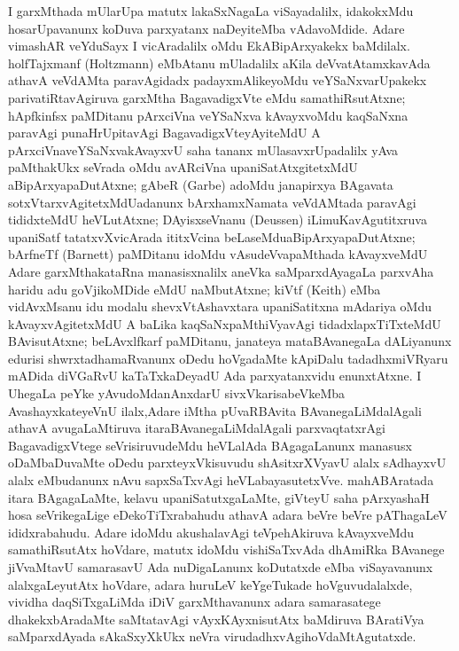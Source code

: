 I garxMthada mUlarUpa matutx lakaSxNagaLa viSayadalilx, idakokxMdu hosa\-rUpa\-vanunx koDuva parxyatanx naDeyiteMba vAdavoMdide. Adare vimashAR veYduSayx I vicAradalilx oMdu EkABipArxyakekx baMdilalx. holfTajxmanf {\rm(Holtzmann)} eMbA\-tanu mUladalilx aKila deVvatAtamxkavAda athavA veVdAMta paravAgidadx padayx\-mAlike\break\-yoMdu veYSaNxvarUpakekx parivatiRtavAgiruva garxMtha BagavadigxVte eMdu samathiRsu\-tAtxne; hApfkinfsx paMDitanu pArxciVna veYSaNxva kAvayxvoMdu kaqSaNxna paravAgi punaHrUpita\-vAgi BagavadigxVteyAyiteMdU A pArxciVnaveYSaNxvakAvayxvU saha tananx mUlasavxrUpa\-dalilx yAva paMthakUkx seVrada oMdu avARciVna upaniSatAtxgitetxMdU aBipArxya\-paDutAtxne; gAbeR {\rm(Garbe)} adoMdu janapirxya BAgavata sotxVtarxvAgitetxMdU\break \hbox{adanunx} bArxhamxNamata veVdAMtada paravAgi tididxteMdU heVLutAtxne; DAyisxseVnanu {\rm(Deussen)} iLimuKavAgutitxruva upaniSatf tatatxvXvicArada ititxVcina beLaseMdu\break aBipArxyapaDutAtxne; bArfneTf {\rm(Barnett)} paMDitanu idoMdu vAsudeVva\break paMthada kAvayxveMdU Adare garxMthakataRna manasisxnalilx aneVka saMparxdAyagaLa parxvAha haridu adu goVjikoMDide eMdU naMbutAtxne; kiVtf {\rm(Keith)} eMba vidAvxMsanu idu modalu shevxVtAshavxtara upaniSatitxna mAdariya oMdu kAvayxvAgitetxMdU A baLika kaqSaNxpaMthiVyavAgi tidadxlapxTiTxteMdU BAvisutAtxne; beLAvxlfkarf paMDitanu, janateya mataBAvanegaLa dALiyanunx edurisi shwrxtadhamaRvanunx oDedu hoVgadaMte kApiDalu tadadhxmiVRyaru mADida diVGaRvU kaTaTxkaDeyadU Ada parxyatanxvidu enunxtAtxne. I UhegaLa peYke yAvudoMdanAnxdarU sivxVkarisabeVkeMba AvashayxkateyeVnU ilalx,\break Adare iMtha pUvaRBAvita BAvanegaLiMdalAgali athavA avugaLaMtiruva itara\break BAvanegaLiMdalAgali parxvaqtatxrAgi BagavadigxVtege seVrisiruvudeMdu heVLalAda BAga\break\-gaLanunx manasusx oDaMbaDuvaMte oDedu parxteyxVkisuvudu shAsitxrXVyavU alalx sAdhayxvU alalx eMbudanunx nAvu sapxSaTxvAgi heVLabayasutetxVve. mahABAratada itara BAga\-gaLaMte, kelavu upaniSatutxgaLaMte, giVteyU saha pArxyashaH hosa seVrikegaLige eDekoTiTxra\-bahudu athavA adara beVre beVre pAThagaLeV ididxrabahudu. Adare idoMdu akushala\-vAgi teVpehAkiruva kAvayxveMdu samathiRsutAtx hoVdare, matutx idoMdu vishiSaTx\-vAda dhAmiRka BAvanege jiVvaMtavU samarasavU Ada nuDigaLanunx koDutatxde eMba viSayavanunx alalxgaLeyutAtx hoVdare, adara huruLeV keYgeTukade hoVguvudalalxde, vividha daqSiTxgaLiMda iDiV garxMthavanunx adara samarasatege dhakekxbAradaMte saMtata\-vAgi vAyxKAyxnisutAtx baMdiruva BAratiVya saMparxdAyada sAkaSxyXkUkx neVra virudadhxvAgi\break hoVdaMtAgutatxde.

